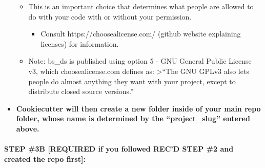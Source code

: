 \documentclass[11pt]{article}
\providecommand{\tightlist}{%
      \setlength{\itemsep}{0pt}\setlength{\parskip}{0pt}}
\begin{document}
\begin{itemize}
  \begin{itemize}
  \tightlist
  \item
    This is an important choice that determines what people are allowed
    to do with your code with or without your permission.

    \begin{itemize}
    \tightlist
    \item
      Consult https://choosealicense.com/ (github website explaining
      licenses) for information.
    \end{itemize}
  \item
    Note: bs\_ds is published using option 5 - GNU General Public
    License v3, which choosealicense.com defines as: \textgreater{}``The
    GNU GPLv3 also lets people do almost anything they want with your
    project, except to distribute closed source versions.''
  \end{itemize}
\item
  \textbf{Cookiecutter will then create a new folder inside of your main
  repo folder, whose name is determined by the ``project\_slug'' entered
  above.}
\end{itemize}

\hypertarget{step-3b-required-if-you-followed-recd-step-2-and-created-the-repo-first}{%
\paragraph{STEP \#3B {[}REQUIRED if you followed REC'D STEP \#2 and
created the repo
first{]}:}\label{step-3b-required-if-you-followed-recd-step-2-and-created-the-repo-first}}
\end{document}

